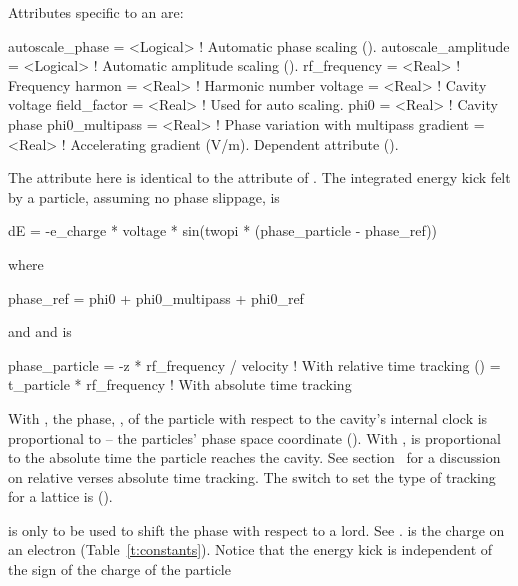 {
Attributes specific to an  are:
\begin{example}
  autoscale_phase     = <Logical>  ! Automatic phase scaling ().
  autoscale_amplitude = <Logical>  ! Automatic amplitude scaling ().
  rf_frequency   = <Real>    ! Frequency
  harmon         = <Real>    ! Harmonic number
  voltage        = <Real>    ! Cavity voltage
  field_factor   = <Real>    ! Used for auto scaling.
  phi0           = <Real>    ! Cavity phase
  phi0_multipass = <Real>    ! Phase variation with multipass
  gradient       = <Real>    ! Accelerating gradient (V/m). Dependent attribute ().
\end{example}

The  attribute here is identical to the  attribute of
\mad. The integrated energy kick felt by a particle, assuming no phase slippage, is 
\begin{example}
  dE = -e_charge * voltage * sin(twopi * (phase_particle - phase_ref))
\end{example}
where
\begin{example}
  phase_ref = phi0 + phi0_multipass + phi0_ref
\end{example}
and
and  is
\begin{example}
  phase_particle = -z * rf_frequency / velocity  ! With relative time tracking ()
                 =  t_particle * rf_frequency    ! With absolute time tracking
\end{example}
With , the phase, , of
the particle with respect to the cavity's internal clock is
proportional to  -- the particles' phase space coordinate
(). With ,
 is proportional to the absolute time the particle
reaches the cavity. See section~ for a discussion on
relative verses absolute time tracking. The switch to set the type of
tracking for a lattice is 
().

 is only to be used to shift the phase with respect
to a  lord. See .  is the
charge on an electron (Table~\ref{t:constants}). Notice that the
energy kick is independent of the sign of the charge of the particle

}
